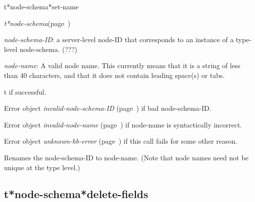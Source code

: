\begin{description}
\item [Name:]  t*node-schema*set-name

\item [Class:] {\sl t*node-schema}\hfill(page~\pageref{t*node-schema})

\item [Parameters:]
\item {\sl node-schema-ID}:  a server-level node-ID that corresponds to an 
instance of a type-level node-schema. (???)


\item {\sl node-name}:  
A valid node name. This currently means that it is a
string of less than 40 characters, and that it does
not contain leading space(s) or tabs.


\item [Return-value:]
t if successful.

Error object {\sl invalid-node-schema-ID} (page~\pageref{invalid-node-schema-ID}) if bad 
node-schema-ID. 

Error object {\sl invalid-node-name} (page~\pageref{invalid-node-name}) if node-name is 
syntactically incorrect.

Error object {\sl unknown-hb-error} (page~\pageref{unknown-hb-error}) if this call
fails for some other reason.

\item [Description:]
Renames the node-schema-ID to node-name.  
(Note that node names need not be unique at the 
type level.)

\item [Public:]



\end{description}
\horizontalline

\subsection{t*node-schema*delete-fields}
\label{t*node-schema*delete-fields}

